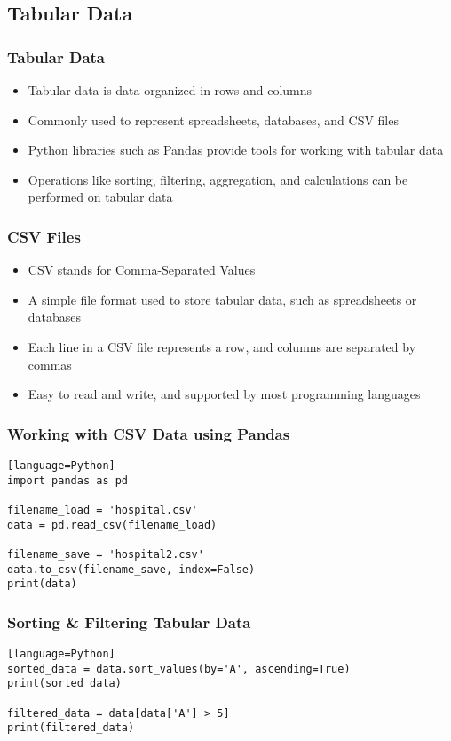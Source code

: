 \documentclass{beamer}
\begin{document}
\subsection{Tabular Data}
\begin{frame}
\frametitle{Tabular Data}
\begin{itemize}
\item Tabular data is data organized in rows and columns
\item Commonly used to represent spreadsheets, databases, and CSV files
\item Python libraries such as Pandas provide tools for working with tabular data
\item Operations like sorting, filtering, aggregation, and calculations can be performed on tabular data
\end{itemize}
\end{frame}

\begin{frame}
\frametitle{CSV Files}
\begin{itemize}
\item CSV stands for Comma-Separated Values
\item A simple file format used to store tabular data, such as spreadsheets or databases
\item Each line in a CSV file represents a row, and columns are separated by commas
\item Easy to read and write, and supported by most programming languages
\end{itemize}
\end{frame}

\begin{frame}[fragile]
\frametitle{Working with CSV Data using Pandas}
\begin{lstlisting}[caption=Load a CSV file using Pandas][language=Python]
import pandas as pd

filename_load = 'hospital.csv'
data = pd.read_csv(filename_load)

filename_save = 'hospital2.csv'
data.to_csv(filename_save, index=False)
print(data)
\end{lstlisting}
\end{frame}

\begin{frame}[fragile]
\frametitle{Sorting \& Filtering Tabular Data}
\begin{lstlisting}[caption=Sorting data by a column using Pandas][language=Python]
sorted_data = data.sort_values(by='A', ascending=True)
print(sorted_data)

filtered_data = data[data['A'] > 5]
print(filtered_data)
\end{lstlisting}
\end{frame}
\end{document}
